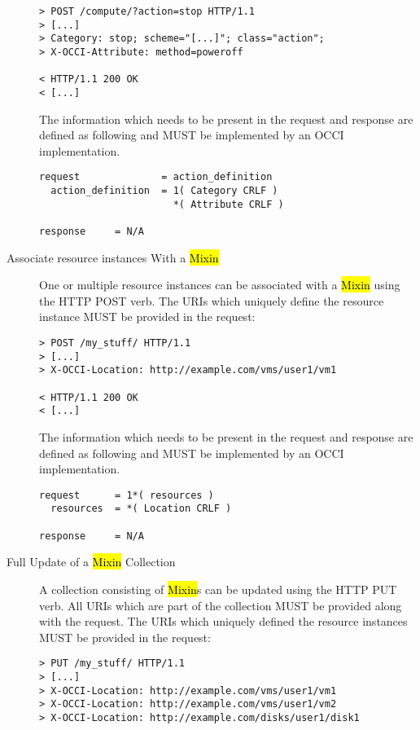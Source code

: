 \documentclass[10pt,a4paper]{article}
\begin{document}
\begin{description}
\begin{verbatim}
> POST /compute/?action=stop HTTP/1.1
> [...]
> Category: stop; scheme="[...]"; class="action";
> X-OCCI-Attribute: method=poweroff

< HTTP/1.1 200 OK
< [...]
\end{verbatim}

    The information which needs to be present in the request and
    response are defined as following and MUST be implemented by an
    OCCI implementation.

\begin{verbatim}
request              = action_definition
  action_definition  = 1( Category CRLF )
                       *( Attribute CRLF )

response     = N/A
\end{verbatim}

  \item[Associate resource instances With a \hl{Mixin}] One or
    multiple resource instances can be associated with a \hl{Mixin}
    using the HTTP POST verb. The URIs which uniquely define the
    resource instance MUST be provided in the request:

\begin{verbatim}
> POST /my_stuff/ HTTP/1.1
> [...]
> X-OCCI-Location: http://example.com/vms/user1/vm1

< HTTP/1.1 200 OK
< [...]
\end{verbatim}

    The information which needs to be present in the request and
    response are defined as following and MUST be implemented by an
    OCCI implementation.

\begin{verbatim}
request      = 1*( resources )
  resources  = *( Location CRLF )

response     = N/A
\end{verbatim}

  \item[Full Update of a \hl{Mixin} Collection] A
    collection consisting of \hl{Mixin}s can be updated
    using the HTTP PUT verb. All URIs which are part of the
    collection MUST be provided along with the request. The URIs which
    uniquely defined the resource instances MUST be provided in the
    request:

\begin{verbatim}
> PUT /my_stuff/ HTTP/1.1
> [...]
> X-OCCI-Location: http://example.com/vms/user1/vm1
> X-OCCI-Location: http://example.com/vms/user1/vm2
> X-OCCI-Location: http://example.com/disks/user1/disk1


\end{verbatim}
\end{description}
\end{document}
